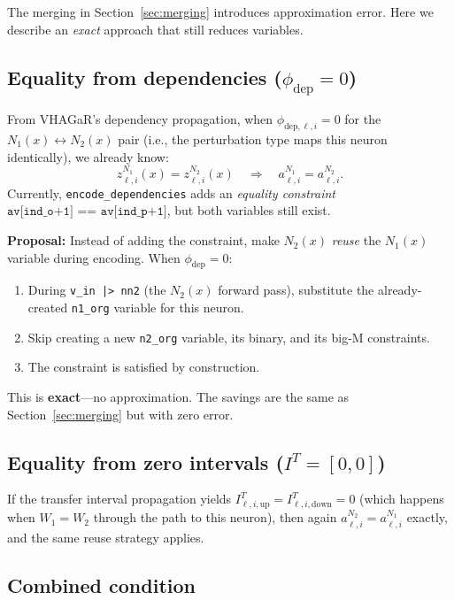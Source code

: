 \documentclass[11pt]{article}
\newcommand{\layerl}{\ell}
\begin{document}
The merging in Section~\ref{sec:merging} introduces approximation error.
Here we describe an \emph{exact} approach that still reduces variables.

\subsection{Equality from dependencies ($\phi_{\text{dep}} = 0$)}

From VHAGaR's dependency propagation, when $\phi_{\text{dep},\layerl,i} = 0$ for
the $N_1(x) \leftrightarrow N_2(x)$ pair (i.e., the perturbation type maps this
neuron identically), we already know:
\[
    z^{N_1}_{\layerl,i}(x) = z^{N_2}_{\layerl,i}(x)
    \quad\Longrightarrow\quad
    a^{N_1}_{\layerl,i} = a^{N_2}_{\layerl,i}.
\]
Currently, \texttt{encode\_dependencies} adds an \emph{equality constraint}
$\texttt{av[ind\_o+1] == av[ind\_p+1]}$, but both variables still exist.

\textbf{Proposal:} Instead of adding the constraint, make $N_2(x)$ \emph{reuse}
the $N_1(x)$ variable during encoding. When $\phi_{\text{dep}} = 0$:
\begin{enumerate}
    \item During \texttt{v\_in |> nn2} (the $N_2(x)$ forward pass), substitute
          the already-created \texttt{n1\_org} variable for this neuron.
    \item Skip creating a new \texttt{n2\_org} variable, its binary, and its
          big-M constraints.
    \item The constraint is satisfied by construction.
\end{enumerate}

This is \textbf{exact}---no approximation. The savings are the same as
Section~\ref{sec:merging} but with zero error.

\subsection{Equality from zero intervals ($I^T = [0,0]$)}

If the transfer interval propagation yields $I^T_{\layerl,i,\text{up}} = I^T_{\layerl,i,\text{down}} = 0$
(which happens when $W_1 = W_2$ through the path to this neuron),
then again $a^{N_2}_{\layerl,i} = a^{N_1}_{\layerl,i}$ exactly,
and the same reuse strategy applies.

\subsection{Combined condition}
\end{document}
